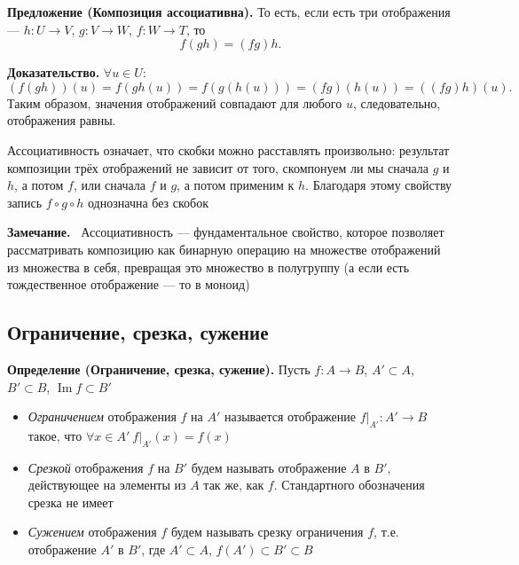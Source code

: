 \documentclass[a4paper,12pt]{article}
\newcommand{\myremark}{\textbf{Замечание.}\ }
\theoremstyle{definition}
\theoremstyle{plain}
\theoremstyle{remark}
\begin{document}
	\noindent \textbf{Предложение (Композиция ассоциативна).}
	То есть, если есть три отображения — $h \colon U \to V$, $g \colon V \to W$, $f \colon W \to T$, то
	\[
	f(gh) = (fg)h.
	\]
	
	\medskip
	\noindent \textbf{Доказательство.}
	$\forall u \in U$:
	\[
	(f(gh))(u) = f(gh(u)) = f(g(h(u))) = (fg)(h(u)) = ((fg)h)(u).
	\]
	Таким образом, значения отображений совпадают для любого $u$, следовательно, отображения равны.
	
	\begin{tcolorbox}[colback=green!5, colframe=green!50!black, title=Пояснение]
		Ассоциативность означает, что скобки можно расставлять произвольно: результат композиции трёх отображений не зависит от того, скомпонуем ли мы сначала $g$ и $h$, а потом $f$, или сначала $f$ и $g$, а потом применим к $h$. Благодаря этому свойству запись $f \circ g \circ h$ однозначна без скобок
	\end{tcolorbox}
	
	\myremark
	Ассоциативность — фундаментальное свойство, которое позволяет рассматривать композицию как бинарную операцию на множестве отображений из множества в себя, превращая это множество в полугруппу (а если есть тождественное отображение — то в моноид)
	
	\subsection{Ограничение, срезка, сужение}
	
	\noindent \textbf{Определение (Ограничение, срезка, сужение).}
	Пусть $f \colon A \to B$, $A' \subset A$, $B' \subset B$, $\operatorname{Im} f \subset B'$
	
	\begin{itemize}
		\item \textit{Ограничением} отображения $f$ на $A'$ называется отображение $f|_{A'} \colon A' \to B$ такое, что $\forall x \in A' \ f|_{A'}(x) = f(x)$
		
		\item \textit{Срезкой} отображения $f$ на $B'$ будем называть отображение $A$ в $B'$, действующее на элементы из $A$ так же, как $f$. Стандартного обозначения срезка не имеет
		
		\item \textit{Сужением} отображения $f$ будем называть срезку ограничения $f$, т.е. отображение $A'$ в $B'$, где $A' \subset A$, $f(A') \subset B' \subset B$
	\end{itemize}
	
\end{document}
